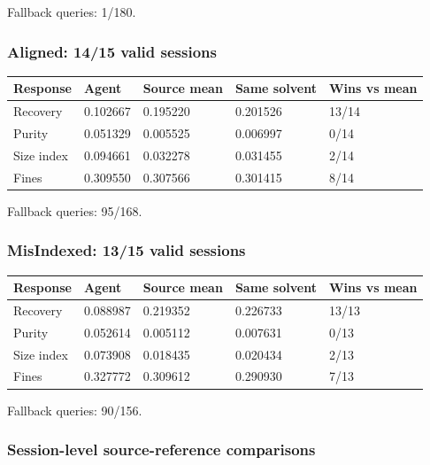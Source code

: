 \documentclass[10pt,a4paper]{article}
\begin{document}
Fallback queries: 1/180.

\subsubsection{Aligned: 14/15 valid sessions}\label{aligned-1415-valid-sessions}

{\def\LTcaptype{table} %
\small\begin{longtable}[]{@{}lllll@{}}
\toprule\noalign{}
Response & Agent & Source mean & Same solvent & Wins vs mean \\
\midrule\noalign{}
\endhead
\bottomrule\noalign{}
\endlastfoot
Recovery & 0.102667 & 0.195220 & 0.201526 & 13/14 \\
Purity & 0.051329 & 0.005525 & 0.006997 & 0/14 \\
Size index & 0.094661 & 0.032278 & 0.031455 & 2/14 \\
Fines & 0.309550 & 0.307566 & 0.301415 & 8/14 \\
\end{longtable}\normalsize
}

Fallback queries: 95/168.

\subsubsection{MisIndexed: 13/15 valid sessions}\label{misindexed-1315-valid-sessions}

{\def\LTcaptype{table} %
\small\begin{longtable}[]{@{}lllll@{}}
\toprule\noalign{}
Response & Agent & Source mean & Same solvent & Wins vs mean \\
\midrule\noalign{}
\endhead
\bottomrule\noalign{}
\endlastfoot
Recovery & 0.088987 & 0.219352 & 0.226733 & 13/13 \\
Purity & 0.052614 & 0.005112 & 0.007631 & 0/13 \\
Size index & 0.073908 & 0.018435 & 0.020434 & 2/13 \\
Fines & 0.327772 & 0.309612 & 0.290930 & 7/13 \\
\end{longtable}\normalsize
}

Fallback queries: 90/156.

\subsubsection{Session-level source-reference comparisons}\label{session-level-source-reference-comparisons}
\end{document}
